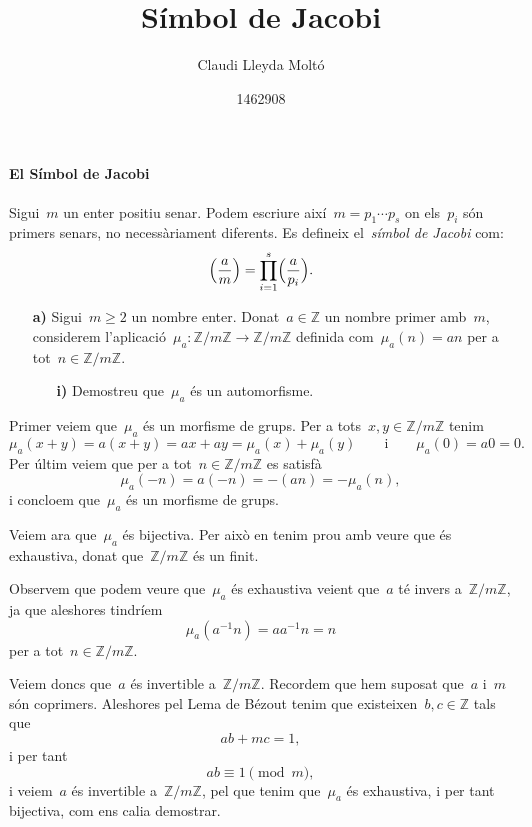 \documentclass[a4paper]{article}
\title{Símbol de Jacobi}
\author{Claudi Lleyda Moltó}
\date{1462908}
\newcommand{\ZZ}{\mathbb{Z}}
\begin{document}
\maketitle

\paragraph{El Símbol de Jacobi} Sigui~\(m\) un enter positiu senar.
Podem escriure així~\(m=p_{1}\cdots p_{s}\) on els~\(p_{i}\) són primers senars,
no necessàriament diferents.
Es defineix el~\emph{símbol de Jacobi} com:
\[
    \Bigl(\frac{a}{m}\Bigr)
    =
    \prod_{i=1}^{s}
    \Bigl(\frac{a}{p_{i}}\Bigr).
\]

\begin{enumerate}
    \item[\textbf{a)}] Sigui~\(m\geq2\) un nombre enter.
        Donat~\(a\in\ZZ\) un nombre primer amb~\(m\),
        considerem l'aplicació~\(\mu_{a}:\ZZ/m\ZZ\longrightarrow\ZZ/m\ZZ\)
        definida com~\(\mu_{a}(n)=an\) per a tot~\(n\in\ZZ/m\ZZ\).
        \begin{enumerate}
            \item[\textbf{i)}] Demostreu que~\(\mu_{a}\) és un automorfisme.
        \end{enumerate}
\end{enumerate}

Primer veiem que~\(\mu_{a}\) és un morfisme de grups.
Per a tots~\(x,y\in\ZZ/m\ZZ\) tenim
\[
    \mu_{a}(x+y) = a(x+y) = ax + ay = \mu_{a}(x) + \mu_{a}(y)
    \qquad
    \text{i}
    \qquad
    \mu_{a}(0) = a0 = 0.
\]
Per últim veiem que per a tot~\(n\in\ZZ/m\ZZ\) es satisfà
\[
    \mu_{a}(-n) = a(-n) = -(an) = -\mu_{a}(n),
\]
i concloem que~\(\mu_{a}\) és un morfisme de grups.

Veiem ara que~\(\mu_{a}\) és bijectiva.
Per això en tenim prou amb veure que és exhaustiva,
donat que~\(\ZZ/m\ZZ\) és un finit.

Observem que podem veure que~\(\mu_{a}\) és exhaustiva veient que~\(a\) té
invers a~\(\ZZ/m\ZZ\),
ja que aleshores tindríem
\[
    \mu_{a}(a^{-1}n) = aa^{-1}n = n
\]
per a tot~\(n\in\ZZ/m\ZZ\).

Veiem doncs que~\(a\) és invertible a~\(\ZZ/m\ZZ\).
Recordem que hem suposat que~\(a\) i~\(m\) són coprimers.
Aleshores pel Lema de Bézout tenim que existeixen~\(b,c\in\ZZ\) tals que
\[
    ab + mc = 1,
\]
i per tant
\[
    ab \equiv 1 \pmod{m},
\]
i veiem~\(a\) és invertible a~\(\ZZ/m\ZZ\),
pel que tenim que~\(\mu_{a}\) és exhaustiva,
i per tant bijectiva,
com ens calia demostrar.
\end{document}
